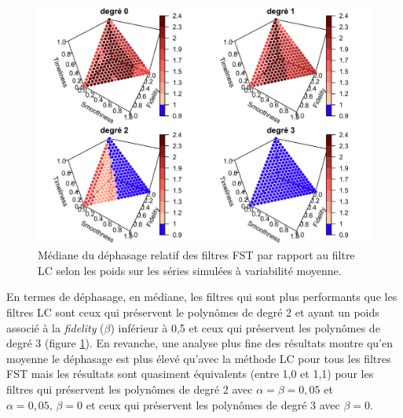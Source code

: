 \documentclass[
  12pt,
  french,
  12pt,a4paper]{article}
\newcommand\1{\mathds{1}}
\begin{document}
\begin{figure}

{\centering \includegraphics[width=0.9\linewidth]{img/simulations/fst_mediumvariability_tp_med} 

}

\caption[Médiane du déphasage relatif des filtres FST par rapport au filtre LC selon les poids sur les séries simulées à variabilité moyenne]{Médiane du déphasage relatif des filtres FST par rapport au filtre LC selon les poids sur les séries simulées à variabilité moyenne.}\label{fig:graphstpsimulfst}

\footnotesize
\normalsize\end{figure}

En termes de déphasage, en médiane, les filtres qui sont plus performants que les filtres LC sont ceux qui préservent le polynômes de degré 2 et ayant un poids associé à la \emph{fidelity} (\(\beta\)) inférieur à 0,5 et ceux qui préservent les polynômes de degré 3 (figure \ref{fig:graphstpsimulfst}).
En revanche, une analyse plus fine des résultats montre qu'en moyenne le déphasage est plus élevé qu'avec la méthode LC pour tous les filtres FST mais les résultats sont quasiment équivalents (entre 1,0 et 1,1) pour les filtres qui préservent les polynômes de degré 2 avec \(\alpha = \beta =0,05\) et \(\alpha = 0,05, \, \beta =0\) et ceux qui préservent les polynômes de degré 3 avec \(\beta=0\).
\end{document}
